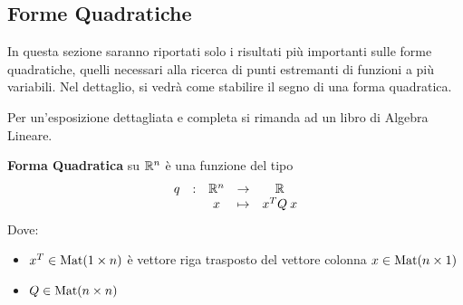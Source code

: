 \renewcommand{\thesection}{\Alph{section}} %
\begin{appendices}
\section{Forme Quadratiche}\label{sect:for_quadr}
In questa sezione saranno riportati solo i risultati più importanti sulle forme quadratiche, quelli necessari alla ricerca di punti estremanti di funzioni a più variabili. Nel dettaglio, si vedrà come stabilire il segno di una forma quadratica.

Per un'esposizione dettagliata e completa si rimanda ad un libro di Algebra Lineare.

\begin{definition}
	\label{def:form_quadr}
	\textbf{Forma Quadratica} su $\mathbb{R}^n$ è una funzione del tipo
	\[\begin{array}{ccccc} {q} & : & {\mathbb{R}^n} & \to & {\mathbb{R}} \\ & & {x} & \mapsto & {x^T Q \: x} \\ \end{array}\]
	Dove:
	\begin{itemize}[noitemsep]
		\item $x^T \in \operatorname{Mat}(1 \times n)$ è vettore riga trasposto del vettore colonna $x \in \operatorname{Mat}(n \times 1)$
		\item $Q \in \operatorname{Mat}(n \times n)$
	\end{itemize}


\end{definition}
\end{appendices}
